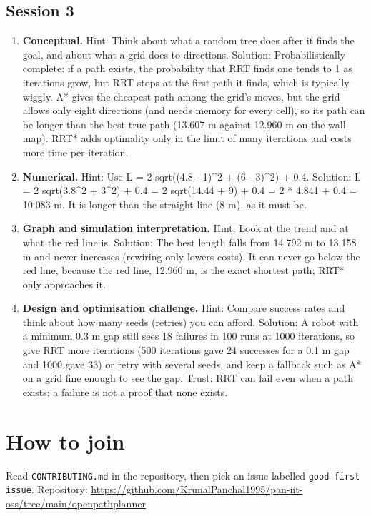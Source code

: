 \documentclass[11pt,a4paper]{article}
\begin{document}
\subsection*{Session 3}
\begin{enumerate}[nosep]
\item \textbf{Conceptual.} Hint: Think about what a random tree does after it finds the goal, and about what a grid does to directions. Solution: Probabilistically complete: if a path exists, the probability that RRT finds one tends to 1 as iterations grow, but RRT stops at the first path it finds, which is typically wiggly. A* gives the cheapest path among the grid's moves, but the grid allows only eight directions (and needs memory for every cell), so its path can be longer than the best true path (13.607 m against 12.960 m on the wall map). RRT* adds optimality only in the limit of many iterations and costs more time per iteration.
\item \textbf{Numerical.} Hint: Use L = 2 sqrt((4.8 - 1)\textasciicircum{}2 + (6 - 3)\textasciicircum{}2) + 0.4. Solution: L = 2 sqrt(3.8\textasciicircum{}2 + 3\textasciicircum{}2) + 0.4 = 2 sqrt(14.44 + 9) + 0.4 = 2 * 4.841 + 0.4 = 10.083 m. It is longer than the straight line (8 m), as it must be.
\item \textbf{Graph and simulation interpretation.} Hint: Look at the trend and at what the red line is. Solution: The best length falls from 14.792 m to 13.158 m and never increases (rewiring only lowers costs). It can never go below the red line, because the red line, 12.960 m, is the exact shortest path; RRT* only approaches it.
\item \textbf{Design and optimisation challenge.} Hint: Compare success rates and think about how many seeds (retries) you can afford. Solution: A robot with a minimum 0.3 m gap still sees 18 failures in 100 runs at 1000 iterations, so give RRT more iterations (500 iterations gave 24 successes for a 0.1 m gap and 1000 gave 33) or retry with several seeds, and keep a fallback such as A* on a grid fine enough to see the gap. Trust: RRT can fail even when a path exists; a failure is not a proof that none exists.
\end{enumerate}

\section{How to join}
Read \texttt{CONTRIBUTING.md} in the repository, then pick an issue labelled \texttt{good first issue}. Repository: \url{https://github.com/KrunalPanchal1995/pan-iit-oss/tree/main/openpathplanner}
\end{document}
